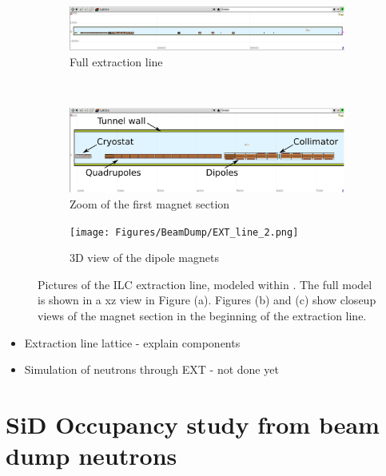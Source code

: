 \begin{figure}[h]
 \centering
  \begin{subfigure}[b]{\textwidth}
   \centering
    \includegraphics[width=\textwidth]{Figures/BeamDump/EXT_line.png}
   \caption{Full extraction line}
   \end{subfigure}\\
   \begin{subfigure}[b]{0.63\textwidth}
   \centering
    \includegraphics[width=\textwidth]{Figures/BeamDump/EXT_line_1.png}
   \caption{Zoom of the first magnet section}
   \end{subfigure}
   \hfill
    \begin{subfigure}[b]{0.35\textwidth}
   \centering
    \texttt{[image: Figures/BeamDump/EXT\_line\_2.png]}
   \caption{3D view of the dipole magnets}
   \end{subfigure}
   \caption[\fluka model of the ILC extraction line]{Pictures of the ILC extraction line, modeled within \flair.
   The full model is shown in a xz view in Figure (a).
   Figures (b) and (c) show closeup views of the magnet section in the beginning of the extraction line.}
   \label{fig:BeamDumps:EXT}
\end{figure} 

\begin{itemize}
 \item Extraction line lattice - explain components
 \item Simulation of neutrons through EXT - not done yet
\end{itemize}

\section{SiD Occupancy study from beam dump neutrons}
\label{BeamDumps:SiDocc}

